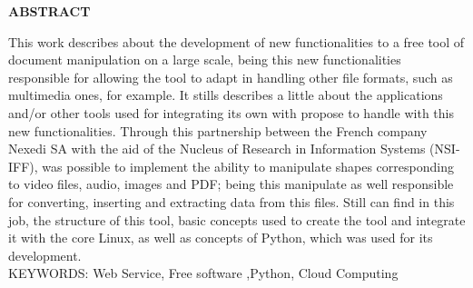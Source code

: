 \begin{center}
\textbf{ABSTRACT}
\end{center}

\singlespacing

\noindent This work describes about the development of new functionalities to a free tool of document manipulation on a large scale, being this new functionalities responsible for allowing the tool to adapt in handling other file formats, such as multimedia ones, for example. It stills describes a little about the applications and/or other tools used for integrating its own with propose to handle with this new functionalities. Through this partnership between the French company Nexedi SA with the aid of the Nucleus of Research in Information Systems (NSI-IFF), was possible to implement the ability to manipulate shapes corresponding to video files, audio, images and PDF; being this manipulate as well responsible for converting, inserting and extracting data from this files. Still can find in this job, the structure of this tool, basic concepts used to create the tool and integrate it with the core Linux, as well as concepts of Python, which was used for its development. \\

\noindent KEYWORDS: Web Service, Free software ,Python, Cloud Computing 

